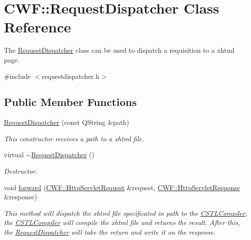 \hypertarget{class_c_w_f_1_1_request_dispatcher}{\section{C\+W\+F\+:\+:Request\+Dispatcher Class Reference}
\label{class_c_w_f_1_1_request_dispatcher}
}


The \hyperlink{class_c_w_f_1_1_request_dispatcher}{Request\+Dispatcher} class can be used to dispatch a requisition to a xhtml page.  




{\ttfamily \#include $<$requestdispatcher.\+h$>$}

\subsection*{Public Member Functions}
\begin{DoxyCompactItemize}
\item 
\hyperlink{class_c_w_f_1_1_request_dispatcher_a165259f215b920a52573dbc37c3985f2}{Request\+Dispatcher} (const Q\+String \&path)
\begin{DoxyCompactList}\small\item\em This constructor receives a path to a xhtml file. \end{DoxyCompactList}\item 
virtual \hyperlink{class_c_w_f_1_1_request_dispatcher_a668e801a8b718373e9e886c613ed54ad}{$\sim$\+Request\+Dispatcher} ()
\begin{DoxyCompactList}\small\item\em Destructor. \end{DoxyCompactList}\item 
void \hyperlink{class_c_w_f_1_1_request_dispatcher_a075c11ff233f217196764899f9edf7d0}{forward} (\hyperlink{class_c_w_f_1_1_http_servlet_request}{C\+W\+F\+::\+Http\+Servlet\+Request} \&request, \hyperlink{class_c_w_f_1_1_http_servlet_response}{C\+W\+F\+::\+Http\+Servlet\+Response} \&response)
\begin{DoxyCompactList}\small\item\em This method will dispatch the xhtml file specificated in path to the \hyperlink{class_c_w_f_1_1_c_s_t_l_compiler}{C\+S\+T\+L\+Compiler}, the \hyperlink{class_c_w_f_1_1_c_s_t_l_compiler}{C\+S\+T\+L\+Compiler} will compile the xhtml file and returns the result. After this, the \hyperlink{class_c_w_f_1_1_request_dispatcher}{Request\+Dispatcher} will take the return and write it on the response. \end{DoxyCompactList}\end{DoxyCompactItemize}


